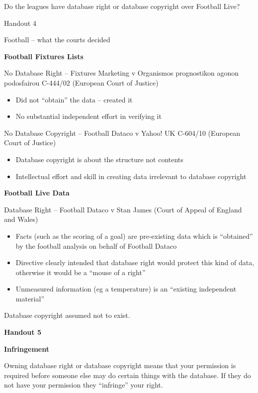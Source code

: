Do the leagues have database right or database copyright over Football
Live?

Handout 4

Football -- what the courts decided

\textbf{Football Fixtures Lists}

No Database Right -- Fixtures Marketing v Organismos prognostikon agonon
podosfairou C-444/02 (European Court of Justice)

\begin{itemize}
\item
  Did not ``obtain'' the data -- created it
\item
  No substantial independent effort in verifying it
\end{itemize}

No Database Copyright -- Football Dataco v Yahoo! UK C-604/10 (European
Court of Justice)

\begin{itemize}
\item
  Database copyright is about the structure not contents
\item
  Intellectual effort and skill in creating data irrelevant to database
  copyright
\end{itemize}

\textbf{Football Live Data}

Database Right -- Football Dataco v Stan James (Court of Appeal of
England and Wales)

\begin{itemize}
\item
  Facts (such as the scoring of a goal) are pre-existing data which is
  ``obtained'' by the football analysis on behalf of Football Dataco
\item
  Directive clearly intended that database right would protect this kind
  of data, otherwise it would be a ``mouse of a right''
\item
  Unmeasured information (eg a temperature) is an ``existing independent
  material''
\end{itemize}

Database copyright assumed not to exist.

\textbf{Handout 5}

\textbf{Infringement}

Owning database right or database copyright means that your permission
is required before someone else may do certain things with the database.
If they do not have your permission they ``infringe'' your right.

